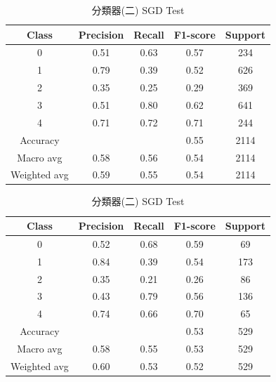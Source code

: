 \begin{enumerate}
\begin{enumerate}
                \begin{table}[H]
                \centering
                \scriptsize
                \begin{minipage}{0.48\textwidth}
                \centering
                \begin{tabular}{c|cccc}
                \hline
                Class & Precision & Recall & F1-score & Support \\
                \hline
                0 & 0.51 & 0.63 & 0.57 & 234 \\
                1 & 0.79 & 0.39 & 0.52 & 626 \\
                2 & 0.35 & 0.25 & 0.29 & 369 \\
                3 & 0.51 & 0.80 & 0.62 & 641 \\
                4 & 0.71 & 0.72 & 0.71 & 244 \\
                \hline
                Accuracy &       &       & 0.55 & 2114 \\
                Macro avg & 0.58 & 0.56 & 0.54 & 2114 \\
                Weighted avg & 0.59 & 0.55 & 0.54 & 2114 \\
                \hline
                \end{tabular}
                \caption{分類器(二) SGD Train}
                \label{tab:classifier_2_report_train_rf_sgd_non_filtered}
                \end{minipage}%
                \hfill
                \begin{minipage}{0.48\textwidth}
                \centering
                \begin{tabular}{c|cccc}
                \hline
                Class & Precision & Recall & F1-score & Support \\
                \hline
                0 & 0.52 & 0.68 & 0.59 & 69 \\
                1 & 0.84 & 0.39 & 0.54 & 173 \\
                2 & 0.35 & 0.21 & 0.26 & 86 \\
                3 & 0.43 & 0.79 & 0.56 & 136 \\
                4 & 0.74 & 0.66 & 0.70 & 65 \\
                \hline
                Accuracy &       &       & 0.53 & 529 \\
                Macro avg & 0.58 & 0.55 & 0.53 & 529 \\
                Weighted avg & 0.60 & 0.53 & 0.52 & 529 \\
                \hline
                \end{tabular}
                \caption{分類器(二) SGD Test}
                \label{tab:classifier_2_report_test_rf_sgd_non_filtered}
                \end{minipage}
                \end{table}



\end{enumerate}
\end{enumerate}

